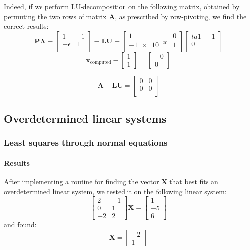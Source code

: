 \documentclass[a4paper,11]{article}
\begin{document}
\begin{itemize}
{		Indeed, if we perform LU-decomposition on the following matrix,
		obtained by permuting the two rows of matrix $\mathbf{A}$, as
		prescribed by row-pivoting, we find the correct results:
		\[
			\mathbf{PA}=
			\begin{bmatrix}
			1 & -1 \\
			-\epsilon & 1 \\
			\end{bmatrix}
			=\mathbf{LU}=
			\begin{bmatrix}
				1 & 0 \\
				\num{-1e-20} & 1\\
			\end{bmatrix}
			\begin{bmatrix}ta
				\num{1} & -1 \\
				0 & \num{1} \\
			\end{bmatrix} 
		\]
		\[
			\mathbf{x}_{\text{computed}} -
			\begin{bmatrix} 1 \\ 1 \end{bmatrix} 
			= \begin{bmatrix} \num{-0} \\ 0 \end{bmatrix}
		\]

		\[
			\mathbf{A}-\mathbf{LU} = 
			\begin{bmatrix}
				0 & 0 \\
				0 & 0 \\
			\end{bmatrix}
		\]
	}
\end{itemize}

\subsection{Overdetermined linear systems}

\subsubsection{Least squares through normal equations}\label{sssection:lsqr_normal}

\paragraph{Results}

After implementing a routine for finding the vector $\mathbf{X}$ that best
fits an overdetermined linear system, we tested it on the following linear 
system:
\[
	\begin{bmatrix}
		2 & -1 \\
		0 & 1 \\
		-2 & 2
	\end{bmatrix}
	\mathbf{X}=
	\begin{bmatrix}
		1 \\
		-5 \\
		6
	\end{bmatrix}
\]
and found:
\[
	\mathbf{X}=
	\begin{bmatrix}
		-2 \\
		1
	\end{bmatrix}
\]
\end{document}
